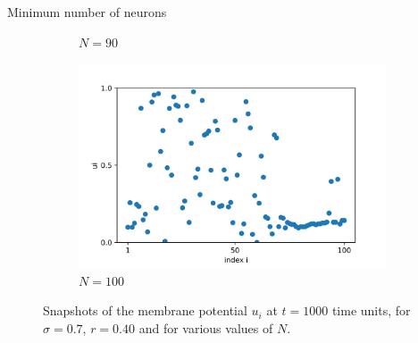\documentclass{beamer}
\begin{document}
\begin{frame}{Minimum number of neurons}
\begin{figure}[H]
\begin{subfigure}{.32\textwidth}
  \caption{$N=90$}
\end{subfigure}
\hfill
\begin{subfigure}{.32\textwidth}
  \centering
  \includegraphics[width=1\linewidth]{u_N=100.png}  
  \caption{$N=100$}
\end{subfigure}
\caption{Snapshots of the membrane potential $u_i$ at $t=1000$ time units, for $\sigma = 0.7$, $r=0.40$ and for various values of $N$.}
\label{vsN}
\end{figure}
\end{frame}
\end{document}
